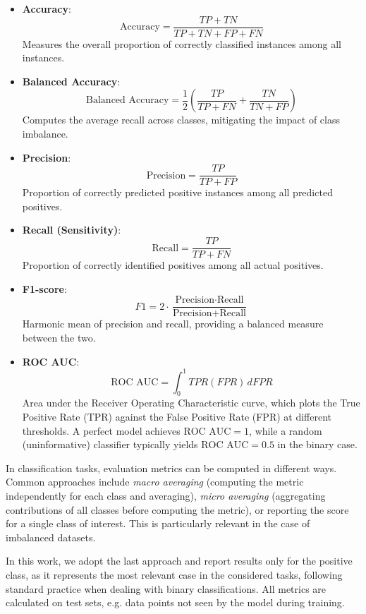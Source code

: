 \documentclass[a4paper,twoside,12pt]{book}
\begin{document}
\begin{itemize}
	\item \textbf{Accuracy}:  
	$$
	\text{Accuracy} = \frac{TP + TN}{TP + TN + FP + FN}
	$$
	Measures the overall proportion of correctly classified instances among all instances.  
	
	\item \textbf{Balanced Accuracy}:  
	$$
	\text{Balanced Accuracy} = \frac{1}{2}\left(\frac{TP}{TP + FN} + \frac{TN}{TN + FP}\right)
	$$
	Computes the average recall across classes, mitigating the impact of class imbalance.  
	
	\item \textbf{Precision}:  
	$$
	\text{Precision} = \frac{TP}{TP + FP}
	$$
	Proportion of correctly predicted positive instances among all predicted positives.  
	
	\item \textbf{Recall (Sensitivity)}:  
	$$
	\text{Recall} = \frac{TP}{TP + FN}
	$$
	Proportion of correctly identified positives among all actual positives.  
	
	\item \textbf{F1-score}:  
	$$
	F1 = 2 \cdot \frac{\text{Precision} \cdot \text{Recall}}{\text{Precision} + \text{Recall}}
	$$
	Harmonic mean of precision and recall, providing a balanced measure between the two.  
	
	\item \textbf{ROC AUC}:  
	$$
	\text{ROC AUC} = \int_0^1 TPR(FPR) \, dFPR
	$$
	Area under the Receiver Operating Characteristic curve, which plots the True Positive Rate (TPR) against the False Positive Rate (FPR) at different thresholds.  
	A perfect model achieves $\text{ROC AUC} = 1$, while a random (uninformative) classifier typically yields $\text{ROC AUC} = 0.5$ in the binary case.  
\end{itemize}

In classification tasks, evaluation metrics can be computed in different ways. Common approaches include \textit{macro averaging} (computing the metric independently for each class and averaging), \textit{micro averaging} (aggregating contributions of all classes before computing the metric), or reporting the score for a single class of interest. This is particularly relevant in the case of imbalanced datasets.

In this work, we adopt the last approach and report results only for the positive class, as it represents the most relevant case in the considered tasks, following standard practice when dealing with binary classifications. All metrics are calculated on test sets, e.g. data points not seen by the model during training. 
\end{document}
